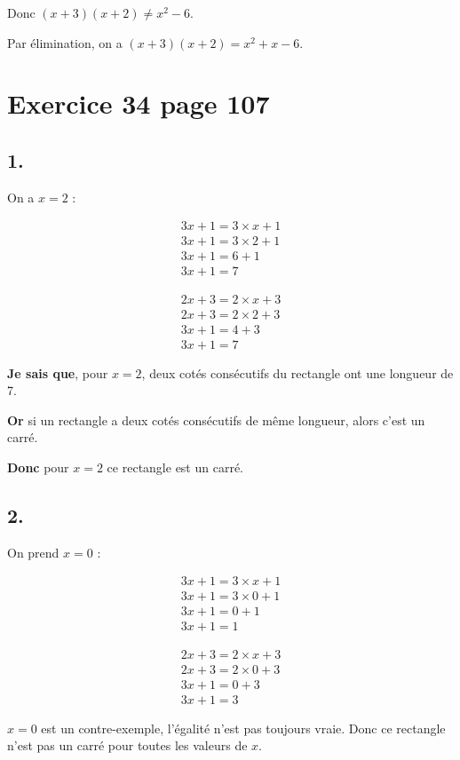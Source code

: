 \documentclass[12pt,a4paper]{article}
\begin{document}
	Donc $(x +3)(x+2) \neq x^2-6$.
	
	Par élimination, on a $ (x +3)(x+2) = x^2 +x -6$.
	

\section*{Exercice 34 page 107}


	
	\subsection*{1.}
	On a $x=2$ :
	
	
	\begin{multicols}{2}
		\begin{align}
			3x+1 = 3 \times x + 1\\
			3x+1 = 3 \times 2 + 1\\
			3x+1 = 6 + 1\\
			3x+1 = 7
		\end{align}
		
		\begin{align}
			2x+3 = 2 \times x + 3\\
			2x+3 = 2 \times 2 + 3\\
			3x+1 = 4 + 3\\
			3x+1 = 7
		\end{align}
	\end{multicols}

	\textbf{Je sais que}, pour $x=2$, deux cotés consécutifs du rectangle ont une longueur de 7.
	
	\textbf{Or} si un rectangle a deux cotés consécutifs de même longueur, alors c'est un carré.
	
	\textbf{Donc} pour $x=2$ ce rectangle est un carré.
	
	\newpage
	
	\subsection*{2.}
	
	On prend $x=0$ :
	
	
	\begin{multicols}{2}
		\begin{align}
			3x+1 = 3 \times x + 1\\
			3x+1 = 3 \times 0 + 1\\
			3x+1 = 0 + 1\\
			3x+1 = 1
		\end{align}
		
		\begin{align}
			2x+3 = 2 \times x + 3\\
			2x+3 = 2 \times 0 + 3\\
			3x+1 = 0 + 3\\
			3x+1 = 3
		\end{align}
	\end{multicols}

	$x=0$ est un contre-exemple, l'égalité n'est pas toujours vraie. Donc ce rectangle n'est pas un carré pour toutes les valeurs de $x$.
\end{document}
